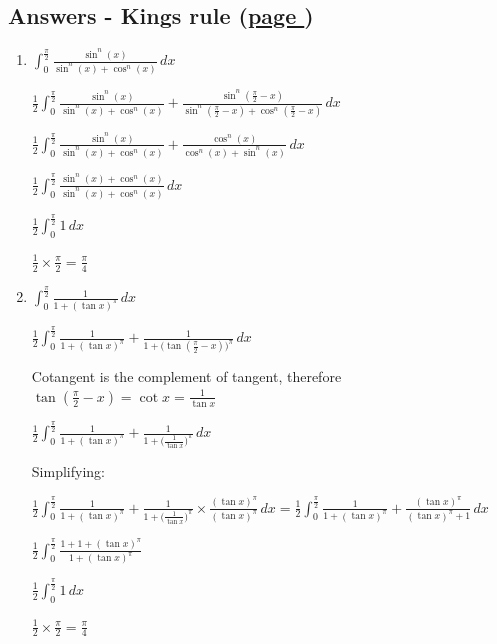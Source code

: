 \documentclass[../main.tex]{subfiles}
\begin{document}
\hypertarget{kingsruleanswers}{\subsection*{Answers - Kings rule (\hyperlink{kingsrulelink}{page \pageref{Kings rule}})}}

\label{Kings rule answers}
\begin{enumerate}[itemsep=0.7cm]
    \item 
    $\int_0^{\frac{\pi}{2}}\frac{\sin^n{(x)}}{\sin^n{(x)}+\cos^n{(x)}}\,dx$

    $\frac{1}{2}\int_0^{\frac{\pi}{2}}\frac{\sin^n{(x)}}{\sin^n{(x)}+\cos^n{(x)}}+\frac{\sin^n{(\frac{\pi}{2}-x)}}{\sin^n{(\frac{\pi}{2}-x)}+\cos^n{(\frac{\pi}{2}-x)}}\,dx$

    $\frac{1}{2}\int_0^{\frac{\pi}{2}}\frac{\sin^n{(x)}}{\sin^n{(x)}+\cos^n{(x)}}+\frac{\cos^n{(x)}}{\cos^n{(x)}+\sin^n{(x)}}\,dx$

    $\frac{1}{2}\int_0^{\frac{\pi}{2}}\frac{\sin^n{(x)}+\cos^n{(x)}}{\sin^n{(x)}+\cos^n{(x)}}\,dx$

    $\frac{1}{2}\int_0^{\frac{\pi}{2}}1\,dx$

    $\frac{1}{2}\times \frac{\pi}{2}=\frac{\pi}{4}$

    \item 
    $\int_0^{\frac{\pi}{2}}\frac{1}{1+(\tan{x})^{\pi}}\,dx$

    $\frac{1}{2}\int_0^{\frac{\pi}{2}}\frac{1}{1+(\tan{x})^{\pi}}+\frac{1}{1+\bigl(\tan{(\frac{\pi}{2}-x)}\bigr)^{\pi}}\,dx$

    Cotangent is the complement of tangent, therefore $\tan{(\frac{\pi}{2}-x)}=\cot{x}=\frac{1}{\tan{x}}$

    $\frac{1}{2}\int_0^{\frac{\pi}{2}}\frac{1}{1+(\tan{x})^{\pi}}+\frac{1}{1+\bigl(\frac{1}{\tan{x}}\bigr)^{\pi}}\,dx$

    Simplifying:

    $\frac{1}{2}\int_0^{\frac{\pi}{2}}\frac{1}{1+(\tan{x})^{\pi}}+\frac{1}{1+\bigl(\frac{1}{\tan{x}}\bigr)^{\pi}}\times \frac{(\tan{x})^{\pi}}{(\tan{x})^{\pi}}\,dx=\frac{1}{2}\int_0^{\frac{\pi}{2}} \frac{1}{1+(\tan{x})^{\pi}}+\frac{(\tan{x})^{\pi}}{(\tan{x})^{\pi}+1}\,dx$

    $\frac{1}{2}\int_0^{\frac{\pi}{2}} \frac{1+1+(\tan{x})^{\pi}}{1+(\tan{x})^{\pi}}$

    $\frac{1}{2}\int_0^{\frac{\pi}{2}} 1\,dx$

    $\frac{1}{2}\times \frac{\pi}{2}=\frac{\pi}{4}$


\end{enumerate}
\end{document}
